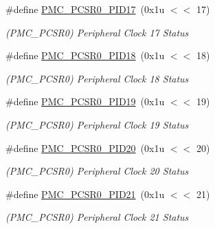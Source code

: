 \begin{DoxyCompactItemize}
\mbox{\label{group__SAMV71__PMC_ga5f42d67ad6601e60109af27d2eb91f2f}} 
\#define \mbox{\hyperlink{group__SAMV71__PMC_ga5f42d67ad6601e60109af27d2eb91f2f}{P\+M\+C\+\_\+\+P\+C\+S\+R0\+\_\+\+P\+I\+D17}}~(0x1u $<$$<$ 17)
\begin{DoxyCompactList}\small\item\em (P\+M\+C\+\_\+\+P\+C\+S\+R0) Peripheral Clock 17 Status \end{DoxyCompactList}\item 
\mbox{\label{group__SAMV71__PMC_ga703eff24f099c4efae05d4a0506798a8}} 
\#define \mbox{\hyperlink{group__SAMV71__PMC_ga703eff24f099c4efae05d4a0506798a8}{P\+M\+C\+\_\+\+P\+C\+S\+R0\+\_\+\+P\+I\+D18}}~(0x1u $<$$<$ 18)
\begin{DoxyCompactList}\small\item\em (P\+M\+C\+\_\+\+P\+C\+S\+R0) Peripheral Clock 18 Status \end{DoxyCompactList}\item 
\mbox{\label{group__SAMV71__PMC_gaee2fed0a8f85d8b1d61d2f39548705f8}} 
\#define \mbox{\hyperlink{group__SAMV71__PMC_gaee2fed0a8f85d8b1d61d2f39548705f8}{P\+M\+C\+\_\+\+P\+C\+S\+R0\+\_\+\+P\+I\+D19}}~(0x1u $<$$<$ 19)
\begin{DoxyCompactList}\small\item\em (P\+M\+C\+\_\+\+P\+C\+S\+R0) Peripheral Clock 19 Status \end{DoxyCompactList}\item 
\mbox{\label{group__SAMV71__PMC_ga2ac7444ae97845536c9af7cd365c3289}} 
\#define \mbox{\hyperlink{group__SAMV71__PMC_ga2ac7444ae97845536c9af7cd365c3289}{P\+M\+C\+\_\+\+P\+C\+S\+R0\+\_\+\+P\+I\+D20}}~(0x1u $<$$<$ 20)
\begin{DoxyCompactList}\small\item\em (P\+M\+C\+\_\+\+P\+C\+S\+R0) Peripheral Clock 20 Status \end{DoxyCompactList}\item 
\mbox{\label{group__SAMV71__PMC_ga00f250bdc8809d1c713a62a87af554bf}} 
\#define \mbox{\hyperlink{group__SAMV71__PMC_ga00f250bdc8809d1c713a62a87af554bf}{P\+M\+C\+\_\+\+P\+C\+S\+R0\+\_\+\+P\+I\+D21}}~(0x1u $<$$<$ 21)
\begin{DoxyCompactList}\small\item\em (P\+M\+C\+\_\+\+P\+C\+S\+R0) Peripheral Clock 21 Status \end{DoxyCompactList}\item 
$$
\end{DoxyCompactItemize}
